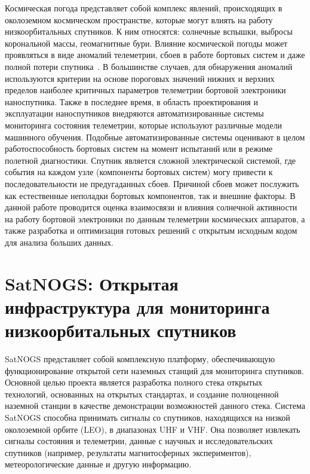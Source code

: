 \documentclass[14pt, a4paper]{extreport}
\begin{document}
    Космическая погода представляет собой комплекс явлений, происходящих в околоземном космическом пространстве, которые могут влиять на работу низкоорбитальных спутников.
    К ним относятся: солнечные вспышки, выбросы корональной массы, геомагнитные бури.
    Влияние космической погоды может проявляться в виде аномалий телеметрии, сбоев в работе бортовых систем и даже полной потери спутника~\cite{green_2017_impact}.
    В большинстве случаев, для обнаружения аномалий используются критерии на основе пороговых значений нижних и верхних пределов наиболее критичных параметров телеметрии бортовой электроники наноспутника.
    Также в последнее время, в область проектирования и эксплуатации наноспутников внедряются автоматизированные системы мониторинга состояния телеметрии, которые используют различные модели машинного обучения\cite{schlag_2018_numerical}.
    Подобные автоматизированные системы оценивают в целом работоспособность бортовых систем на момент испытаний или в режиме полетной диагностики.
    Спутник является сложной электрической системой, где события на каждом узле (компоненты бортовых систем) могу привести к последовательности не предугаданных сбоев.
    Причиной сбоев может послужить как естественные неполадки бортовых компонентов, так и внешние факторы.
    В данной работе проводится оценка взаимосвязи и влияния солнечной активности на работу бортовой электроники по данным телеметрии космических аппаратов, а также разработка и оптимизация готовых решений с открытым исходным кодом для анализа больших данных.

    \newpage


    \section{SatNOGS: Открытая инфраструктура для мониторинга низкоорбитальных спутников}

    SatNOGS представляет собой комплексную платформу, обеспечивающую функционирование открытой сети наземных станций для мониторинга спутников.
    Основной целью проекта является разработка полного стека открытых технологий, основанных на открытых стандартах, и создание полноценной наземной станции в качестве демонстрации возможностей данного стека.
    Система SatNOGS способна принимать сигналы со спутников, находящихся на низкой околоземной орбите (LEO), в диапазонах UHF и VHF. Она позволяет извлекать сигналы состояния и телеметрии, данные с научных и исследовательских спутников (например, результаты магнитосферных экспериментов), метеорологические данные и другую информацию.
\end{document}
